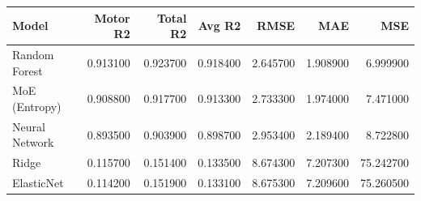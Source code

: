 \begin{tabular}{lrrrrrr}
\toprule
Model & Motor R2 & Total R2 & Avg R2 & RMSE & MAE & MSE \\
\midrule
Random Forest & 0.913100 & 0.923700 & 0.918400 & 2.645700 & 1.908900 & 6.999900 \\
MoE (Entropy) & 0.908800 & 0.917700 & 0.913300 & 2.733300 & 1.974000 & 7.471000 \\
Neural Network & 0.893500 & 0.903900 & 0.898700 & 2.953400 & 2.189400 & 8.722800 \\
Ridge & 0.115700 & 0.151400 & 0.133500 & 8.674300 & 7.207300 & 75.242700 \\
ElasticNet & 0.114200 & 0.151900 & 0.133100 & 8.675300 & 7.209600 & 75.260500 \\
\bottomrule
\end{tabular}
